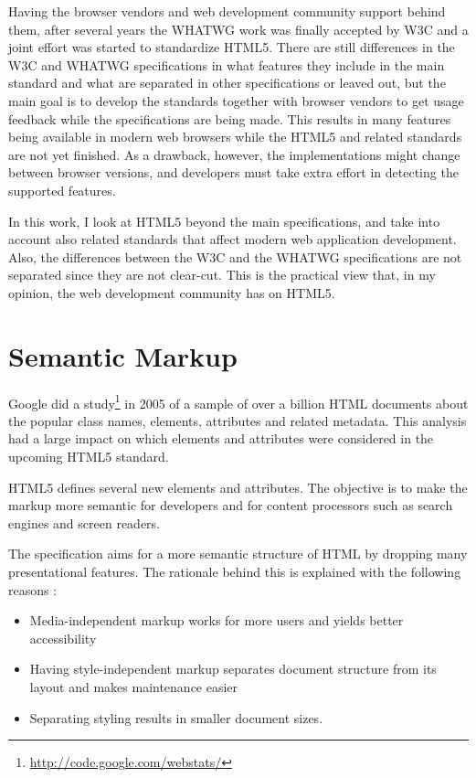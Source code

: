Having the browser vendors and web development community support
behind them, after several years the WHATWG work was finally accepted
by W3C and a joint effort was started to standardize HTML5. There are
still differences in the W3C and WHATWG specifications in what
features they include in the main standard and what are separated in
other specifications or leaved out, but the main goal is to develop
the standards together with browser vendors to get usage feedback
while the specifications are being made. This results in many features
being available in modern web browsers while the HTML5 and related
standards are not yet finished. As a drawback, however, the
implementations might change between browser versions, and developers
must take extra effort in detecting the supported
features. \cite{pilgrim2010html5}

In this work, I look at HTML5 beyond the main specifications, and take
into account also related standards that affect modern web application
development. Also, the differences between the W3C and the WHATWG
specifications are not separated since they are not clear-cut. This is
the practical view that, in my opinion, the web development community
has on HTML5.

\section{Semantic Markup}

Google did a study\footnote{\url{http://code.google.com/webstats/}} in
2005 of a sample of over a billion HTML documents about the popular
class names, elements, attributes and related metadata. This analysis
had a large impact on which elements and attributes were considered in
the upcoming HTML5 standard.

HTML5 defines several new elements and attributes. The objective is to
make the markup more semantic for developers and for content
processors such as search engines and screen readers.

The specification aims for a more semantic structure of HTML by
dropping many presentational features. The rationale behind this is
explained with the following reasons \cite{HTML5draft}:

\begin{itemize}
\item Media-independent markup works for more users and yields better
  accessibility
\item Having style-independent markup separates document structure
  from its layout and makes maintenance easier
\item Separating styling results in smaller document sizes.
\end{itemize}

